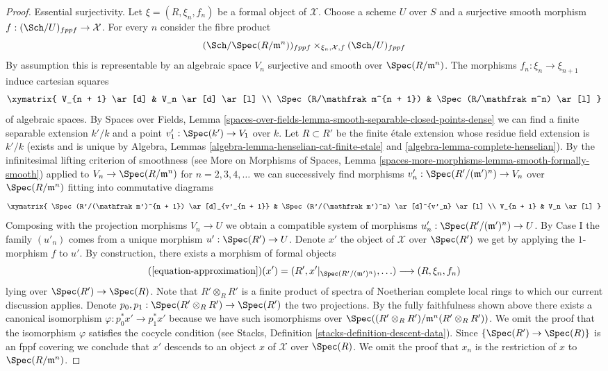 \begin{proof}
\medskip\noindent
Essential surjectivity. Let $\xi = (R, \xi_n, f_n)$ be a formal object of
$\mathcal{X}$. Choose a scheme $U$ over $S$ and a surjective smooth morphism
$f : (\Sch/U)_{fppf} \to \mathcal{X}$. For every $n$ consider the fibre product
$$
(\Sch/\Spec(R/\mathfrak m^n))_{fppf}
\times_{\xi_n, \mathcal{X}, f}
(\Sch/U)_{fppf}
$$
By assumption this is representable by an algebraic space $V_n$ surjective and
smooth over $\Spec(R/\mathfrak m^n)$. The morphisms
$f_n : \xi_n \to \xi_{n + 1}$ induce cartesian squares
$$
\xymatrix{
V_{n + 1} \ar[d] & V_n \ar[d] \ar[l] \\
\Spec(R/\mathfrak m^{n + 1}) & \Spec(R/\mathfrak m^n) \ar[l]
}
$$
of algebraic spaces. By Spaces over Fields, Lemma
\ref{spaces-over-fields-lemma-smooth-separable-closed-points-dense}
we can find a finite separable extension $k'/k$ and a point
$v'_1 : \Spec(k') \to V_1$ over $k$. Let $R \subset R'$ be the finite \'etale
extension whose residue field extension is $k'/k$ (exists and
is unique by
Algebra, Lemmas \ref{algebra-lemma-henselian-cat-finite-etale} and
\ref{algebra-lemma-complete-henselian}).
By the infinitesimal lifting criterion of smoothness (see
More on Morphisms of Spaces, Lemma
\ref{spaces-more-morphisms-lemma-smooth-formally-smooth})
applied to $V_n \to \Spec(R/\mathfrak m^n)$ for $n = 2, 3, 4, \ldots$
we can successively find morphisms
$v'_n : \Spec(R'/(\mathfrak m')^n) \to V_n$ over $\Spec(R/\mathfrak m^n)$
fitting into commutative diagrams
$$
\xymatrix{
\Spec(R'/(\mathfrak m')^{n + 1}) \ar[d]_{v'_{n + 1}} &
\Spec(R'/(\mathfrak m')^n) \ar[d]^{v'_n} \ar[l] \\
V_{n + 1} & V_n \ar[l]
}
$$
Composing with the projection morphisms $V_n \to U$ we obtain a compatible
system of morphisms $u'_n : \Spec(R'/(\mathfrak m')^n) \to U$.
By Case I the family $(u'_n)$ comes from a unique
morphism $u' : \Spec(R') \to U$. Denote $x'$ the object of $\mathcal{X}$
over $\Spec(R')$ we get by applying the $1$-morphism $f$ to $u'$.
By construction, there exists a morphism of formal objects
$$
(\ref{equation-approximation})(x') =
(R', x'|_{\Spec(R'/(\mathfrak m')^n)}, \ldots)
\longrightarrow
(R, \xi_n, f_n)
$$
lying over $\Spec(R') \to \Spec(R)$. Note that $R' \otimes_R R'$ is a finite
product of spectra of Noetherian complete local rings to which our current
discussion applies. Denote $p_0, p_1 : \Spec(R' \otimes_R R') \to \Spec(R')$
the two projections. By the fully faithfulness shown above there exists
a canonical isomorphism $\varphi : p_0^*x' \to p_1^*x'$ because we have
such isomorphisms over
$\Spec((R' \otimes_R R')/\mathfrak m^n(R' \otimes_R R'))$.
We omit the proof that the isomorphism $\varphi$ satisfies the cocycle
condition (see Stacks, Definition \ref{stacks-definition-descent-data}).
Since $\{\Spec(R') \to \Spec(R)\}$ is an fppf covering we conclude
that $x'$ descends to an object $x$ of $\mathcal{X}$ over $\Spec(R)$.
We omit the proof that $x_n$ is the restriction of $x$ to
$\Spec(R/\mathfrak m^n)$.
\end{proof}

